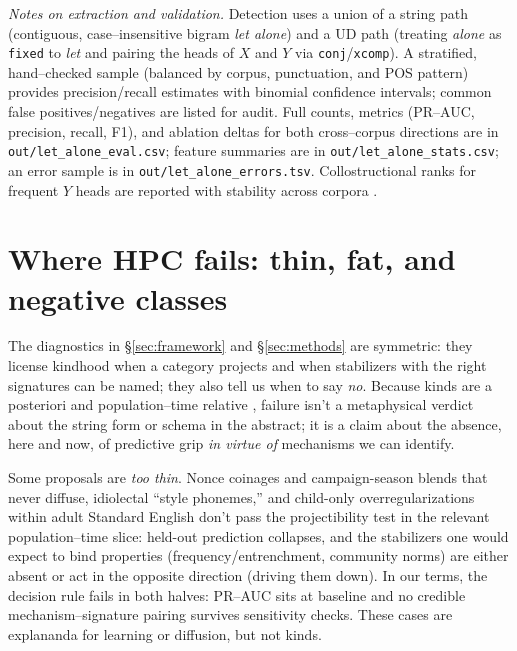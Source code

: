 \documentclass[12pt]{article}
\begin{document}
\bigskip
\noindent\emph{Notes on extraction and validation.} Detection uses a union of a string path (contiguous, case–insensitive bigram \textit{let alone}) and a UD path (treating \textit{alone} as \texttt{fixed} to \textit{let} and pairing the heads of $X$ and $Y$ via \texttt{conj}/\texttt{xcomp}). A stratified, hand–checked sample (balanced by corpus, punctuation, and POS pattern) provides precision/recall estimates with binomial confidence intervals; common false positives/negatives are listed for audit. Full counts, metrics (PR–AUC, precision, recall, F1), and ablation deltas for both cross–corpus directions are in \texttt{out/let\_alone\_eval.csv}; feature summaries are in \texttt{out/let\_alone\_stats.csv}; an error sample is in \texttt{out/let\_alone\_errors.tsv}. Collostructional ranks for frequent $Y$ heads are reported with stability across corpora \citep{StefanowitschGries2003}.


\section{Where HPC fails: thin, fat, and negative classes}\label{sec:failures}

The diagnostics in \S\ref{sec:framework} and \S\ref{sec:methods} are symmetric: they license kindhood when a category projects and when stabilizers with the right signatures can be named; they also tell us when to say \emph{no}. Because kinds are a posteriori and population–time relative \citep{Boyd1991Enthusiasm,Boyd1999Homeostasis}, failure isn't a metaphysical verdict about the string form or schema in the abstract; it is a claim about the absence, here and now, of predictive grip \emph{in virtue of} mechanisms we can identify.

Some proposals are \emph{too thin}. Nonce coinages and campaign-season blends that never diffuse, idiolectal “style phonemes,” and child-only overregularizations within adult Standard English don't pass the projectibility test in the relevant population–time slice: held-out prediction collapses, and the stabilizers one would expect to bind properties (frequency/entrenchment, community norms) are either absent or act in the opposite direction (driving them down). In our terms, the decision rule fails in both halves: PR–AUC sits at baseline and no credible mechanism–signature pairing survives sensitivity checks. These cases are explananda for learning or diffusion, but not kinds.
\end{document}
